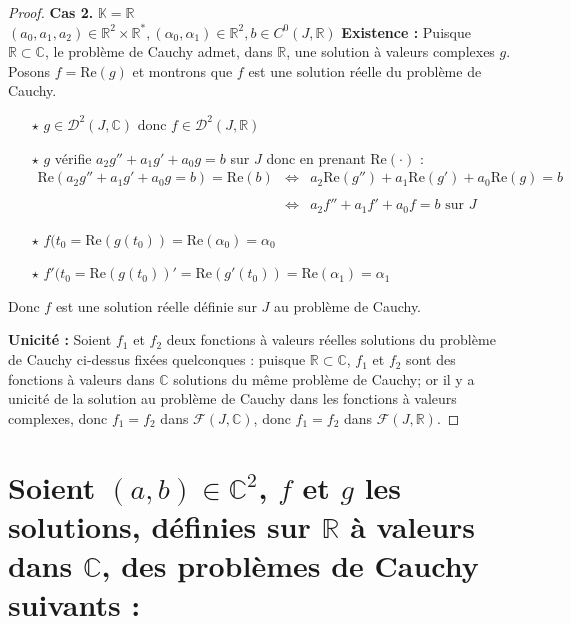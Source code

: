 \documentclass{article}
\renewcommand{\Re}{\text{Re}}
\begin{document}
\begin{proof}
\textbf{Cas 2. } $\mathbb{K} = \mathbb{R}$ \\
$(a_{0}, a_{1}, a_{2}) \in \mathbb{R}^{2} \times \mathbb{R}^{*},(\alpha_{0}, \alpha_{1}) \in \mathbb{R}^{2}, b \in C^{0}(J, \mathbb{R})$ 
\newline
\textbf{Existence :} Puisque $\mathbb{R} \subset \mathbb{C}$, le problème de Cauchy admet, dans $\mathbb{R}$, une solution à valeurs complexes $g$. Posons $f = \Re(g)$ et montrons que $f$ est une solution réelle du problème de Cauchy. \\
\begin{itemize}
    \item[$\star$] $g \in \mathcal{D}^{2}(J, \mathbb{C}) \text{ donc } f \in \mathcal{D}^{2}(J, \mathbb{R})$
    \item[$\star$] $g$ vérifie $a_{2}g'' + a_{1}g' + a_{0}g = b$ sur $J$ donc en prenant $\Re(\cdot)$ : 
    $$\begin{array}{ccl}
      \Re(a_{2}g'' + a_{1}g' + a_{0}g = b) = \Re(b)   
      &\iff &a_{2}\Re(g'') + a_{1}\Re(g') + a_{0}\Re(g) = b  \\\\
      &\iff & a_{2}f'' + a_{1}f' + a_{0}f = b \text{ sur } J
    \end{array}$$
    \item[$\star$] $f(t_{0} = \Re(g(t_{0})) = \Re(\alpha_{0}) = \alpha_{0}$
    \item[$\star$] $f'(t_{0} = \Re(g(t_{0}))' = \Re(g'(t_{0})) = \Re(\alpha_{1}) = \alpha_{1}$
\end{itemize}
Donc $f$ est une solution réelle définie sur $J$ au problème de Cauchy. 
\newline

\textbf{Unicité : }Soient $f_{1}$ et $f_{2}$ deux fonctions à valeurs réelles solutions du problème de Cauchy ci-dessus fixées quelconques : puisque $\mathbb{R} \subset \mathbb{C}$, $f_{1}$ et $f_{2}$ sont des fonctions à valeurs dans $\mathbb{C}$ solutions du même problème de Cauchy; or il y a unicité de la solution au problème de Cauchy dans les fonctions à valeurs complexes, donc $f_{1} = f_{2}$ dans $\mathcal{F}(J, \mathbb{C})$, donc $f_{1} = f_{2}$ dans $\mathcal{F}(J, \mathbb{R})$.
\end{proof}

\section{Soient $(a,b)\in \mathbb{C}^2$, $f$ et $g$ les  solutions, définies sur $\mathbb{R}$ à valeurs
dans $\mathbb{C}$, des problèmes de Cauchy suivants :}
\end{document}
